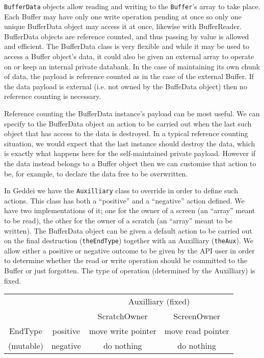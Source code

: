\texttt{BufferData} objects allow reading and writing to the \texttt{Buffer}'s array to take place. Each Buffer may have only one write operation pending at once so only one unique BufferData object may access it at once, likewise with BufferReader. BufferData objects are reference counted, and thus passing by value is allowed and efficient. The BufferData class is very flexible and while it may be used to access a Buffer object's data, it could also be given an external array to operate on or keep an internal private databank. In the case of maintaining its own chunk of data, the payload is reference counted as in the case of the external Buffer. If the data payload is external (i.e. not owned by the BuffeData object) then no reference counting is necessary.

Reference counting the BufferData instance's payload can be most useful. We can specify to the BufferData object an action to be carried out when the last such object that has access to the data is destroyed. In a typical reference counting situation, we would expect that the last instance should destroy the data, which is exactly what happens here for the self-maintained private payload. However if the data instead belongs to a Buffer object then we can customise that action to be, for example, to declare the data free to be overwritten.

In Geddei we have the \texttt{Auxilliary} class to override in order to define such actions. This class has both a ``positive'' and a ``negative'' action defined. We have two implementations of it; one for the owner of a screen (an ``array'' meant to be read), the other for the owner of a scratch (an ``array'' meant to be written). The BufferData object can be given a default action to be carried out on the final destruction (\texttt{theEndType}) together with an Auxilliary (\texttt{theAux}). We allow either a positive or negative outcome to be given by the API user in order to determine whether the read or write operation should be committed to the Buffer or just forgotten. The type of operation (determined by the Auxilliary) is fixed.

\begin{tabular}{|cc|cc|}
\hline
	&		& \multicolumn{2}{c|}{Auxilliary (fixed)} \\
	&		& ScratchOwner		& ScreenOwner \\
\hline
EndType	& positive	& move write pointer	& move read pointer \\
(mutable)	& negative	& do nothing		& do nothing \\
\hline
\end{tabular}

